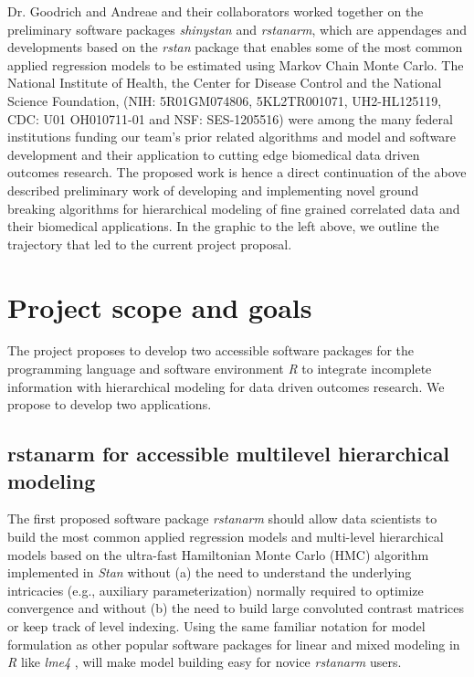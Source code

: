 \documentclass[11pt,notitlepage]{article}
\begin{document}
Dr. Goodrich and Andreae and their collaborators worked together on the preliminary software packages \textit{shinystan} and \textit{rstanarm}, which are appendages and developments based on the \textit{rstan} package that enables some of the most common applied regression models to be estimated using Markov Chain Monte Carlo. The National Institute of Health, the Center for Disease Control and the National Science Foundation, (NIH: 5R01GM074806, 5KL2TR001071, UH2-HL125119,  CDC: U01 OH010711-01 and NSF: SES-1205516) were among the many federal institutions funding our team's prior related algorithms and model and software \cite{Stan-manual:2015} development and their application to cutting edge biomedical data driven outcomes research. The proposed work is hence a direct continuation of the above described preliminary work of developing and implementing novel ground breaking algorithms for hierarchical modeling of fine grained correlated data and their biomedical applications. In the graphic to the left above, we outline the trajectory that led to the current project proposal.


\section*{Project scope and goals }

The project proposes to develop two accessible software packages for the programming language and software environment \textit{R} to integrate incomplete information with hierarchical modeling for data driven outcomes research. We propose to develop two applications.

\subsection*{rstanarm for accessible multilevel hierarchical modeling}
The first proposed software package \textit{rstanarm} should allow data scientists to build the most common applied regression models and multi-level hierarchical models based on the ultra-fast Hamiltonian Monte Carlo (HMC) algorithm implemented in \textit{Stan} without (a) the need to understand the underlying intricacies (e.g., auxiliary parameterization) normally required to optimize convergence and without (b) the need to build large convoluted contrast matrices  or keep track of level indexing. Using the same familiar notation for model formulation as other popular software packages for linear and mixed modeling in \textit{R} like \textit{lme4} \cite{lme4}, will make model building easy for novice \textit{rstanarm} users. 
\end{document}
